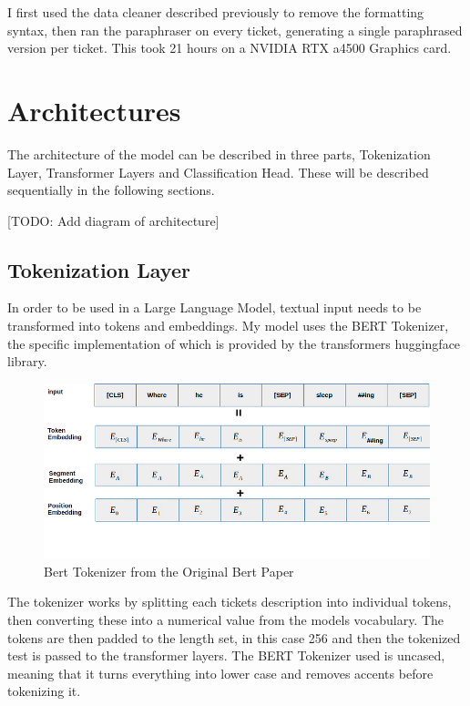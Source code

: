 \documentclass{UoYCSproject}
\begin{document}

    I first used the data cleaner described previously to remove the formatting syntax, then ran the paraphraser on every ticket, generating a single paraphrased version per ticket.
    This took 21 hours on a NVIDIA RTX a4500 Graphics card. \par



    \section{Architectures}\label{sec:architectures}
    The architecture of the model can be described in three parts, Tokenization Layer, Transformer Layers and Classification Head.
    These will be described sequentially in the following sections.\par

    [TODO: Add diagram of architecture]\par

    \subsection[tokenization-layer]{Tokenization Layer}
    In order to be used in a Large Language Model, textual input needs to be transformed into tokens and embeddings.
    My model uses the BERT Tokenizer, the specific implementation of which is provided by the transformers huggingface library. \par

    \begin{figure}[h]
        \includegraphics[width=\textwidth]{./figures/bert-tokenizer}
        \caption{Bert Tokenizer from the Original Bert Paper}
        \label{fig:tokenizer-figure}
    \end{figure}

    The tokenizer works by splitting each tickets description into individual tokens, then converting these into a numerical value from the models vocabulary.
    The tokens are then padded to the length set, in this case 256 and then the tokenized test is passed to the transformer layers.
    The BERT Tokenizer used is uncased, meaning that it turns everything into lower case and removes accents before tokenizing it.
    \par
\end{document}
